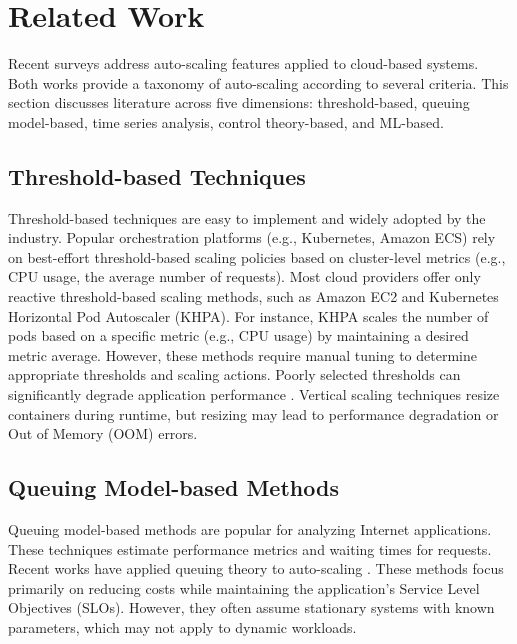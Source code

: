 \documentclass[conference]{IEEEtran}
\begin{document}
\section{Related Work}
\label{sec:related_work}

Recent surveys \cite{qu2018autoscaling, santos2021towards} address auto-scaling features applied to cloud-based systems. Both works provide a taxonomy of auto-scaling according to several criteria. This section discusses literature across five dimensions: threshold-based, queuing model-based, time series analysis, control theory-based, and ML-based.

\subsection{Threshold-based Techniques}
Threshold-based techniques \cite{aws2021autoscaling, kubernetesHPA, kubernetesVPA, alDhuraibi2017elasticDocker, rattihalli2019verticalScaling} are easy to implement and widely adopted by the industry. Popular orchestration platforms (e.g., Kubernetes, Amazon ECS) rely on best-effort threshold-based scaling policies based on cluster-level metrics (e.g., CPU usage, the average number of requests). Most cloud providers offer only reactive threshold-based scaling methods, such as Amazon EC2 and Kubernetes Horizontal Pod Autoscaler (KHPA). For instance, KHPA scales the number of pods based on a specific metric (e.g., CPU usage) by maintaining a desired metric average. However, these methods require manual tuning to determine appropriate thresholds and scaling actions. Poorly selected thresholds can significantly degrade application performance \cite{qu2018autoscaling}. Vertical scaling techniques \cite{alDhuraibi2017elasticDocker, rattihalli2019verticalScaling} resize containers during runtime, but resizing may lead to performance degradation or Out of Memory (OOM) errors.

\subsection{Queuing Model-based Methods}
Queuing model-based methods are popular for analyzing Internet applications. These techniques estimate performance metrics and waiting times for requests. Recent works have applied queuing theory to auto-scaling \cite{gergin2014performance, danilo2018hierarchical}. These methods focus primarily on reducing costs while maintaining the application's Service Level Objectives (SLOs). However, they often assume stationary systems with known parameters, which may not apply to dynamic workloads.
\end{document}
